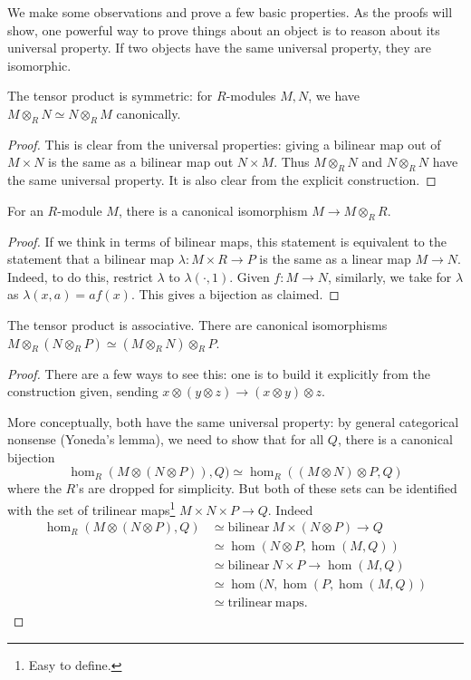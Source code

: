 We make some observations and prove a few basic properties. As the proofs will
show, one powerful way to prove things about an object is to reason about its
universal property. If two objects have the same universal property, they are
isomorphic.

\begin{proposition} 
The tensor product is symmetric: for $R$-modules $M,N$, we have $M \otimes_R N \simeq N \otimes_R M$
canonically. 
\end{proposition} 
\begin{proof} 
This is clear from the universal properties: giving a bilinear map
out of  $M \times N$ is the same as a bilinear map out $N \times M$. 
Thus $M \otimes_R N$ and $N \otimes_R N$ have the same universal property.
It is also
clear from the explicit construction.  
\end{proof} 

\begin{proposition} 
For an $R$-module $M$, there is a canonical isomorphism $M \to M \otimes_R R$.
\end{proposition} 
\begin{proof} 
  If we think in terms of
bilinear maps, this statement is equivalent to the statement that a bilinear
map $\lambda: M \times R \to P$ is the same as a linear map $M \to N$. Indeed,
to do
this, restrict $\lambda$ to $\lambda(\cdot, 1)$.  Given $f: M \to N$,
similarly, we take for $\lambda$ as $\lambda(x,a) = af(x)$. This gives a
bijection as claimed. 
\end{proof} 

\begin{proposition} 
The tensor product is associative.  There are canonical isomorphisms $M \otimes_R (N \otimes_R P) \simeq (M
\otimes_R N) \otimes_R P$. 
\end{proposition} 
\begin{proof} 
 There are a few ways to see this: one is to build
it explicitly from the construction given, sending $x \otimes (y \otimes z) \to
(x \otimes y) \otimes z$. 

More conceptually, both have the same universal
property: by general categorical nonsense (Yoneda's lemma), we need to show
that for all $Q$, there is  a canonical bijection
\[ \hom_R(M \otimes (N \otimes P)), Q) \simeq \hom_R( (M \otimes N)
\otimes P, Q)  \]
where the $R$'s are dropped for simplicity.  But both of these sets can be
identified with the set of trilinear maps\footnote{Easy to define.} $M \times N
\times P \to Q$. Indeed
\begin{align*} 
\hom_R(M \otimes (N \otimes P), Q) & \simeq \mathrm{bilinear} \ M \times (N
\otimes P) \to Q \\
& \simeq \hom(N \otimes P, \hom(M,Q)) \\
& \simeq \mathrm{bilinear} \ N \times P \to \hom(M,Q) \\
& \simeq \hom(N, \hom(P, \hom(M,Q)) \\
& \simeq \mathrm{trilinear\  maps}.
\end{align*} 

\end{proof} 

